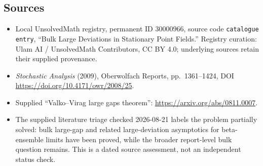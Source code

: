 \documentclass[11pt]{article}
\begin{document}
\subsection{Sources}
\begin{itemize}
\item Local UnsolvedMath registry, permanent ID \(30000966\), source code \texttt{catalogue entry}, ``Bulk Large Deviations in Stationary Point Fields.'' Registry curation: Ulam AI / UnsolvedMath Contributors, CC BY 4.0; underlying sources retain their supplied provenance.
\item \emph{Stochastic Analysis} (2009), Oberwolfach Reports, pp.\ 1361--1424, DOI \url{https://doi.org/10.4171/owr/2008/25}.
\item Supplied ``Valko--Virag large gaps theorem'': \url{https://arxiv.org/abs/0811.0007}.
\item The supplied literature triage checked 2026-08-21 labels the problem partially solved: bulk large-gap and related large-deviation asymptotics for beta-ensemble limits have been proved, while the broader report-level bulk question remains. This is a dated source assessment, not an independent status check.
\end{itemize}
\end{document}
